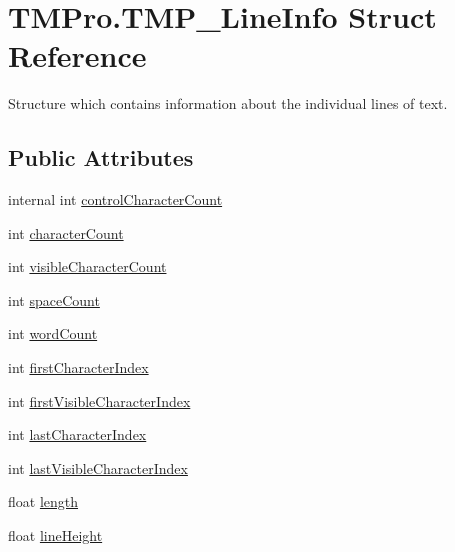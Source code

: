 \hypertarget{struct_t_m_pro_1_1_t_m_p___line_info}{}\section{T\+M\+Pro.\+T\+M\+P\+\_\+\+Line\+Info Struct Reference}
\label{struct_t_m_pro_1_1_t_m_p___line_info}


Structure which contains information about the individual lines of text.  


\subsection*{Public Attributes}
\begin{DoxyCompactItemize}
\item 
internal int \mbox{\hyperlink{struct_t_m_pro_1_1_t_m_p___line_info_a7a70c8164b2fe40ed4c15b5c6ff86f1b}{control\+Character\+Count}}
\item 
int \mbox{\hyperlink{struct_t_m_pro_1_1_t_m_p___line_info_a46fd32d5cb7ef22c3271920bbd943db5}{character\+Count}}
\item 
int \mbox{\hyperlink{struct_t_m_pro_1_1_t_m_p___line_info_a7b8f73404dad3ef77774d60757adc2ae}{visible\+Character\+Count}}
\item 
int \mbox{\hyperlink{struct_t_m_pro_1_1_t_m_p___line_info_ae1ac899765122ca72a864aa9c9092101}{space\+Count}}
\item 
int \mbox{\hyperlink{struct_t_m_pro_1_1_t_m_p___line_info_a5c5c82928595ce3573d26df72a19e041}{word\+Count}}
\item 
int \mbox{\hyperlink{struct_t_m_pro_1_1_t_m_p___line_info_acf7aa2ff53854af329771357909c69b0}{first\+Character\+Index}}
\item 
int \mbox{\hyperlink{struct_t_m_pro_1_1_t_m_p___line_info_a8c8089c64c819c3212964c9520e66008}{first\+Visible\+Character\+Index}}
\item 
int \mbox{\hyperlink{struct_t_m_pro_1_1_t_m_p___line_info_ab23c89a15901d65307ca0249ea16a6e2}{last\+Character\+Index}}
\item 
int \mbox{\hyperlink{struct_t_m_pro_1_1_t_m_p___line_info_ae2b5b0d83015f93ee156c295c79139c5}{last\+Visible\+Character\+Index}}
\item 
float \mbox{\hyperlink{struct_t_m_pro_1_1_t_m_p___line_info_a1c87f92a9502adab77de554f9db6854e}{length}}
\item 
float \mbox{\hyperlink{struct_t_m_pro_1_1_t_m_p___line_info_a61e038b94a1163610fb48f9294ed36d4}{line\+Height}}
\item 

\end{DoxyCompactItemize}
